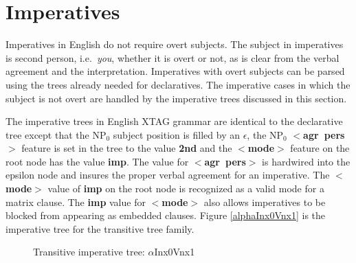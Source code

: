 \chapter{Imperatives}
\label{imperatives}

Imperatives in English do not require overt subjects.  The subject in
imperatives is second person, i.e.\ {\it you}, whether it is overt or
not, as is clear from the verbal agreement and the interpretation.
Imperatives with overt subjects can be  parsed using the trees already
needed for declaratives.  The imperative cases in which the subject is
not overt are handled by the imperative trees discussed in this section.

The imperative trees in English XTAG grammar are identical to the declarative
tree except that the NP$_{0}$ subject position is filled by an $\epsilon$, the
NP$_{0}$ {\bf $<$agr~pers$>$} feature is set in the tree to the value {\bf 2nd}
and the {\bf $<$mode$>$} feature on the root node has the value {\bf imp}.  The
value for {\bf $<$agr~pers$>$} is hardwired into the epsilon node and insures
the proper verbal agreement for an imperative.  The {\bf $<$mode$>$} value of
{\bf imp} on the root node is recognized as a valid mode for a matrix clause.
The {\bf imp} value for {\bf $<$mode$>$} also allows imperatives to be blocked
from appearing as embedded clauses.  Figure \ref{alphaInx0Vnx1} is the
imperative tree for the transitive tree family.

\begin{figure}[htbp]
\caption{Transitive imperative tree: $\alpha$Inx0Vnx1}
\label{alphaInx0Vnx1}
\label{2;11,1}
\end{figure}

